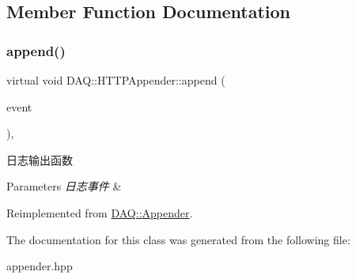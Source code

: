 \subsection{Member Function Documentation}
\mbox{\label{classDAQ_1_1HTTPAppender_a2648d6d4328aea4d6d19ca05677fda1c}} 
\subsubsection{\texorpdfstring{append()}{append()}}
{\footnotesize\ttfamily virtual void D\+A\+Q\+::\+H\+T\+T\+P\+Appender\+::append (\begin{DoxyParamCaption}\item[{Log\+Event\+::sptr}]{event }\end{DoxyParamCaption})\hspace{0.3cm}{\ttfamily [override]}, {\ttfamily [virtual]}}



日志输出函数 


\begin{DoxyParams}{Parameters}
{\em 日志事件} & \\
\hline
\end{DoxyParams}


Reimplemented from \hyperlink{classDAQ_1_1Appender_a49ebbcec4d879ba461080479fa1085aa}{D\+A\+Q\+::\+Appender}.



The documentation for this class was generated from the following file\+:\begin{DoxyCompactItemize}
\item 
appender.\+hpp\end{DoxyCompactItemize}
